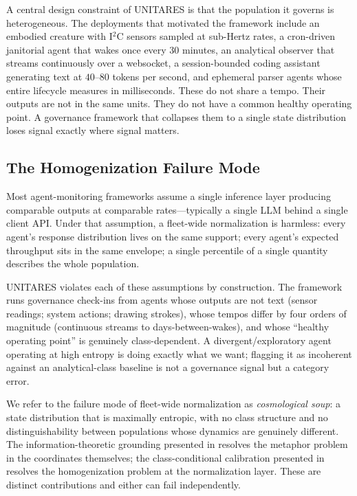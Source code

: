 \documentclass[11pt,twocolumn]{article}
\begin{document}
A central design constraint of UNITARES is that the population it
governs is heterogeneous. The deployments that motivated the
framework include an embodied creature with I$^2$C sensors sampled
at sub-Hertz rates, a cron-driven janitorial agent that wakes once
every 30 minutes, an analytical observer that streams continuously
over a websocket, a session-bounded coding assistant generating
text at $40$--$80$ tokens per second, and ephemeral parser agents
whose entire lifecycle measures in milliseconds. These do not share
a tempo. Their outputs are not in the same units. They do not have
a common healthy operating point. A governance framework that
collapses them to a single state distribution loses signal exactly
where signal matters.

\subsection{The Homogenization Failure Mode}

Most agent-monitoring frameworks assume a single inference layer
producing comparable outputs at comparable rates---typically a
single LLM behind a single client API. Under that assumption, a
fleet-wide normalization is harmless: every agent's response
distribution lives on the same support; every agent's expected
throughput sits in the same envelope; a single percentile of a
single quantity describes the whole population.

UNITARES violates each of these assumptions by construction. The
framework runs governance check-ins from agents whose outputs are
not text (sensor readings; system actions; drawing strokes), whose
tempos differ by four orders of magnitude (continuous streams to
days-between-wakes), and whose ``healthy operating point'' is
genuinely class-dependent. A divergent/exploratory agent operating
at high entropy is doing exactly what we want; flagging it as
incoherent against an analytical-class baseline is not a governance
signal but a category error.

We refer to the failure mode of fleet-wide normalization as
\emph{cosmological soup}: a state distribution that is maximally
entropic, with no class structure and no distinguishability between
populations whose dynamics are genuinely different. The
information-theoretic grounding presented in
 resolves the metaphor problem in the
coordinates themselves; the class-conditional calibration
presented in  resolves the
homogenization problem at the normalization layer. These are
distinct contributions and either can fail independently.
\end{document}
